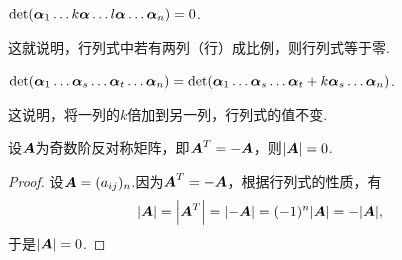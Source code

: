 \begin{property}\label{theorem:行列式.性质5}
\(\det(\boldsymbol{\alpha}_1 \dotso k\boldsymbol{\alpha} \dotso l\boldsymbol{\alpha} \dotso \boldsymbol{\alpha}_n) = 0\).
\end{property}
这就说明，行列式中若有两列（行）成比例，则行列式等于零.

\begin{property}\label{theorem:行列式.性质6}
\(\det(\boldsymbol{\alpha}_1 \dotso \boldsymbol{\alpha}_s \dotso \boldsymbol{\alpha}_t \dotso \boldsymbol{\alpha}_n)
= \det(\boldsymbol{\alpha}_1 \dotso \boldsymbol{\alpha}_s \dotso \boldsymbol{\alpha}_t + k\boldsymbol{\alpha}_s \dotso \boldsymbol{\alpha}_n)\).
\end{property}
这说明，将一列的\(k\)倍加到另一列，行列式的值不变.

\begin{example}
设\(\boldsymbol{A}\)为奇数阶反对称矩阵，即\(\boldsymbol{A}^T = -\boldsymbol{A}\)，则\(\abs{\boldsymbol{A}}=0\).
\begin{proof}
设\(\boldsymbol{A} = (a_{ij})_n\).因为\(\boldsymbol{A}^T = -\boldsymbol{A}\)，根据行列式的性质，有\[
\abs{\boldsymbol{A}} = \abs{\boldsymbol{A}^T} = \abs{-\boldsymbol{A}} = (-1)^n \abs{\boldsymbol{A}} = -\abs{\boldsymbol{A}},
\]于是\(\abs{\boldsymbol{A}} = 0\).
\end{proof}
\end{example}

